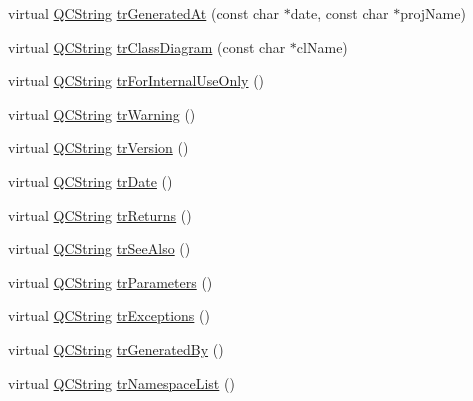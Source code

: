 \begin{DoxyCompactItemize}
\item 
virtual \mbox{\hyperlink{class_q_c_string}{Q\+C\+String}} \mbox{\hyperlink{class_translator_serbian_cyrillic_af449db58ef00e66120ddcac512f30078}{tr\+Generated\+At}} (const char $\ast$date, const char $\ast$proj\+Name)
\item 
virtual \mbox{\hyperlink{class_q_c_string}{Q\+C\+String}} \mbox{\hyperlink{class_translator_serbian_cyrillic_aab6b73d32b61e27327a6846883dfd197}{tr\+Class\+Diagram}} (const char $\ast$cl\+Name)
\item 
virtual \mbox{\hyperlink{class_q_c_string}{Q\+C\+String}} \mbox{\hyperlink{class_translator_serbian_cyrillic_a9e6b78807c432fc6d083d68b48b3e8b0}{tr\+For\+Internal\+Use\+Only}} ()
\item 
virtual \mbox{\hyperlink{class_q_c_string}{Q\+C\+String}} \mbox{\hyperlink{class_translator_serbian_cyrillic_a80540cd63d9d8d3d947b6eef8846f680}{tr\+Warning}} ()
\item 
virtual \mbox{\hyperlink{class_q_c_string}{Q\+C\+String}} \mbox{\hyperlink{class_translator_serbian_cyrillic_aa3ae9ebbab55efd83812aeae18c8b638}{tr\+Version}} ()
\item 
virtual \mbox{\hyperlink{class_q_c_string}{Q\+C\+String}} \mbox{\hyperlink{class_translator_serbian_cyrillic_a5951566c2f2e5897d69fdf5681ce1b62}{tr\+Date}} ()
\item 
virtual \mbox{\hyperlink{class_q_c_string}{Q\+C\+String}} \mbox{\hyperlink{class_translator_serbian_cyrillic_a29bfc5b39fe4da0d7a649acc2b74c130}{tr\+Returns}} ()
\item 
virtual \mbox{\hyperlink{class_q_c_string}{Q\+C\+String}} \mbox{\hyperlink{class_translator_serbian_cyrillic_a8210c715c99c3d7292ac0912ffa988f2}{tr\+See\+Also}} ()
\item 
virtual \mbox{\hyperlink{class_q_c_string}{Q\+C\+String}} \mbox{\hyperlink{class_translator_serbian_cyrillic_ae37b55a1c3fa055d42891c5ccc4b37c9}{tr\+Parameters}} ()
\item 
virtual \mbox{\hyperlink{class_q_c_string}{Q\+C\+String}} \mbox{\hyperlink{class_translator_serbian_cyrillic_aa2bfbaae043f9a0f8473ffba434812b6}{tr\+Exceptions}} ()
\item 
virtual \mbox{\hyperlink{class_q_c_string}{Q\+C\+String}} \mbox{\hyperlink{class_translator_serbian_cyrillic_a52e7248dac2ad31ca3f5bb4808ea6fdc}{tr\+Generated\+By}} ()
\item 
virtual \mbox{\hyperlink{class_q_c_string}{Q\+C\+String}} \mbox{\hyperlink{class_translator_serbian_cyrillic_a8e32fd986cedd63eb19cffc905019d31}{tr\+Namespace\+List}} ()

\end{DoxyCompactItemize}
